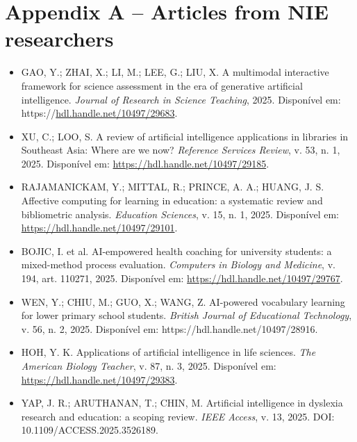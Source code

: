 \documentclass[english]{textolivre}
\begin{document}

\appendix 
\section{Appendix A – Articles from NIE researchers}\label{apx-longtable}

\begin{itemize}
\item[] GAO, Y.; ZHAI, X.; LI, M.; LEE, G.; LIU, X. A multimodal interactive framework for science assessment in the era of generative artificial intelligence. \textit{Journal of Research in Science Teaching}, 2025. Disponível em: https://\url{hdl.handle.net/10497/29683}.

\item[] XU, C.; LOO, S. A review of artificial intelligence applications in libraries in Southeast Asia: Where are we now? \textit{Reference Services Review}, v. 53, n. 1, 2025. Disponível em: \url{https://hdl.handle.net/10497/29185}.

\item[] RAJAMANICKAM, Y.; MITTAL, R.; PRINCE, A. A.; HUANG, J. S. Affective computing for learning in education: a systematic review and bibliometric analysis. \textit{Education Sciences}, v. 15, n. 1, 2025. Disponível em: \url{https://hdl.handle.net/10497/29101}.

\item[] BOJIC, I. et al. AI-empowered health coaching for university students: a mixed-method process evaluation. \textit{Computers in Biology and Medicine}, v. 194, art. 110271, 2025. Disponível em: \url{https://hdl.handle.net/10497/29767}.

\item[] WEN, Y.; CHIU, M.; GUO, X.; WANG, Z. AI-powered vocabulary learning for lower primary school students. \textit{British Journal of Educational Technology}, v. 56, n. 2, 2025. Disponível em: https://hdl.handle.net/10497/28916.

\item[] HOH, Y. K. Applications of artificial intelligence in life sciences. \textit{The American Biology Teacher}, v. 87, n. 3, 2025. Disponível em: \url{https://hdl.handle.net/10497/29383}.

\item[] YAP, J. R.; ARUTHANAN, T.; CHIN, M. Artificial intelligence in dyslexia research and education: a scoping review. \textit{IEEE Access}, v. 13, 2025. DOI: 10.1109/ACCESS.2025.3526189.


\end{itemize}
\end{document}
